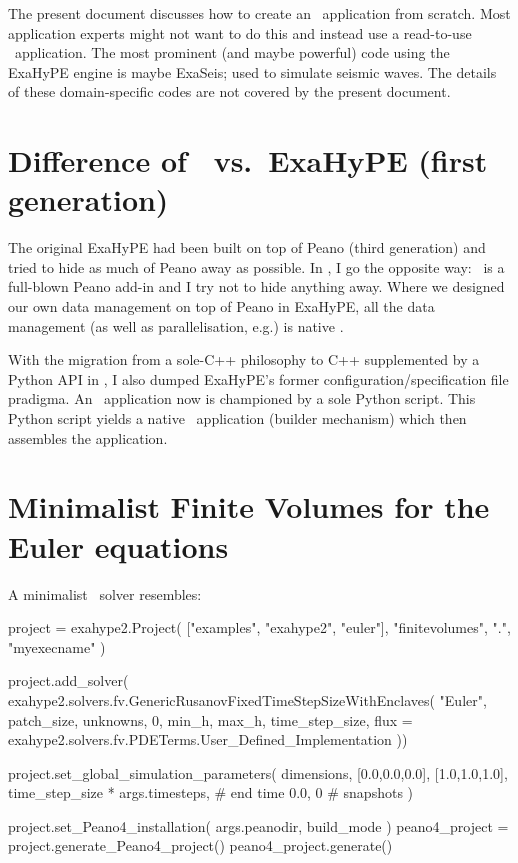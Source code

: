 The present document discusses how to create an \ExaHyPE\ application from
scratch.
Most application experts might not want to do this and instead use a read-to-use
\ExaHyPE\ application.
The most prominent (and maybe powerful) code using the ExaHyPE engine is maybe
ExaSeis; used to simulate seismic waves.
The details of these domain-specific codes are not covered by the present
document.





\section{Difference of \ExaHyPE\ vs.~ExaHyPE (first generation)}

The original ExaHyPE had been built on top of Peano (third generation) and tried
to hide as much of Peano away as possible.
In \ExaHyPE, I go the opposite way: \ExaHyPE\ is a full-blown Peano add-in and I
try not to hide anything away.
Where we designed our own data management on top of Peano in ExaHyPE, all the
data management (as well as parallelisation, e.g.) is native \Peano.


With the migration from a sole-C++ philosophy to C++ supplemented by a Python
API in \Peano, I also dumped ExaHyPE's former configuration/specification file
pradigma.
An \ExaHyPE\ application now is championed by a sole Python script.
This Python script yields a native \Peano\ application (builder mechanism) which
then assembles the application.



\section{Minimalist Finite Volumes for the Euler equations}
\label{section:exahype:fv}

A minimalist \ExaHyPE\ solver resembles:
\begin{code}
project = exahype2.Project( ["examples", "exahype2", "euler"], "finitevolumes", ".", "myexecname" )

project.add_solver(  exahype2.solvers.fv.GenericRusanovFixedTimeStepSizeWithEnclaves(
  "Euler",
  patch_size,
  unknowns, 0,
  min_h, max_h,
  time_step_size,
  flux = exahype2.solvers.fv.PDETerms.User_Defined_Implementation
))

project.set_global_simulation_parameters(
  dimensions, [0.0,0.0,0.0], [1.0,1.0,1.0],
  time_step_size * args.timesteps, # end time
  0.0, 0                           # snapshots
)

project.set_Peano4_installation( args.peanodir, build_mode )
peano4_project = project.generate_Peano4_project()
peano4_project.generate()
\end{code}

